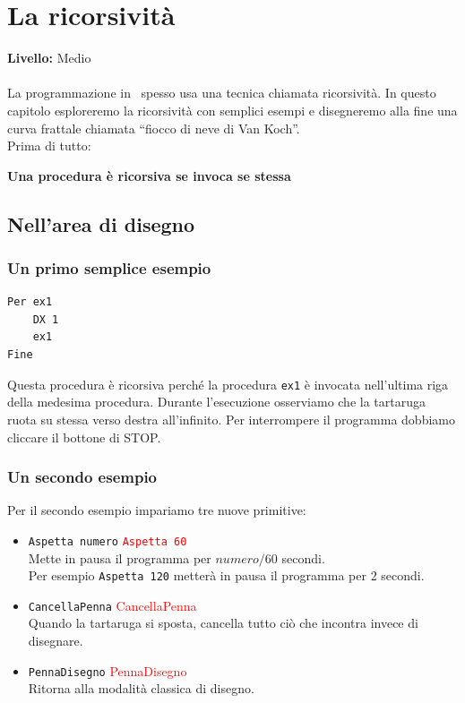 \chapter{La ricorsività}
{ }\hfill\textbf{Livello:} Medio\\ \\

La programmazione in \logo\ spesso usa una tecnica chiamata ricorsività. In questo capitolo esploreremo la ricorsività con semplici esempi e disegneremo alla fine una curva frattale chiamata ``fiocco di neve di Van Koch''.\\
Prima di tutto:
\begin{center}
	\textbf{Una procedura è ricorsiva se invoca se stessa}
\end{center}


\section{Nell'area di disegno}
\subsection{Un primo semplice esempio}
\begin{lstlisting}[caption="Una semplice procedura ricorsiva"]
Per ex1
	DX 1
	ex1
Fine  
\end{lstlisting}
Questa procedura è ricorsiva perché la procedura \texttt{ex1} è invocata nell'ultima riga della medesima procedura. Durante l'esecuzione osserviamo che la tartaruga ruota su stessa verso destra all'infinito. Per interrompere il programma dobbiamo cliccare il bottone di STOP.


\subsection{Un secondo esempio}
Per il secondo esempio impariamo tre nuove primitive:
\begin{itemize}
	\item \texttt{Aspetta numero}\hspace {4cm } \textcolor{red}{ \texttt{Aspetta 60}}\\
	Mette in pausa il programma per $numero / 60$ secondi. \\
	Per esempio \texttt{Aspetta 120} metterà in pausa il programma per 2 secondi.
	\item \texttt{CancellaPenna}\hspace {4cm } \textcolor{red}{{CancellaPenna}}\\
	Quando la tartaruga si sposta, cancella tutto ciò che incontra invece di disegnare.
	\item \texttt{PennaDisegno}\hspace {4cm } \textcolor{red}{PennaDisegno}\\
	Ritorna alla modalità classica di disegno.
\end{itemize}

